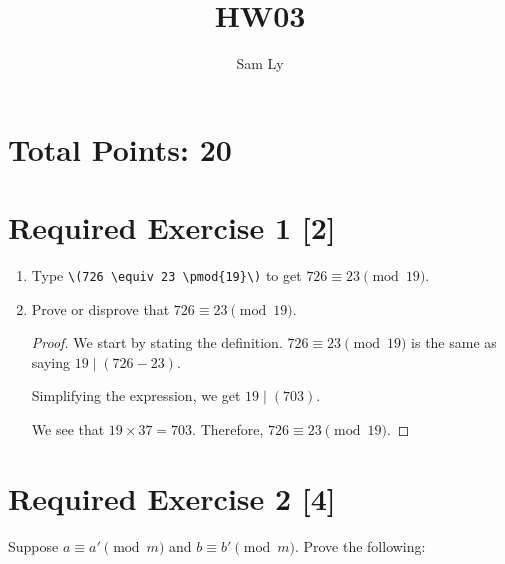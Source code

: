 \documentclass{article}
\title{HW03}
\author{Sam Ly}
\begin{document}
\maketitle

\section*{Total Points: 20}

\section*{Required Exercise 1 [2]}

\begin{enumerate}
    \item {
        Type \verb|\(726 \equiv 23 \pmod{19}\)| to get 
        \(726 \equiv 23 \pmod{19}\).
    }
    \item {
        Prove or disprove that 
        \(726 \equiv 23 \pmod{19}\).

        \begin{proof}
            We start by stating the definition. \(726 \equiv 23 \pmod{19}\) is 
            the same as saying \(19 \mid (726 - 23)\).

            Simplifying the expression, we get \(19 \mid (703)\).

            We see that \(19 \times 37 = 703\). Therefore, \(726 \equiv 23 \pmod{19}\).
        \end{proof}
    }
\end{enumerate}

\section*{Required Exercise 2 [4]}

Suppose \(a \equiv a' \pmod{m}\) and \(b \equiv b' \pmod{m}\). Prove the
following:
\end{document}
